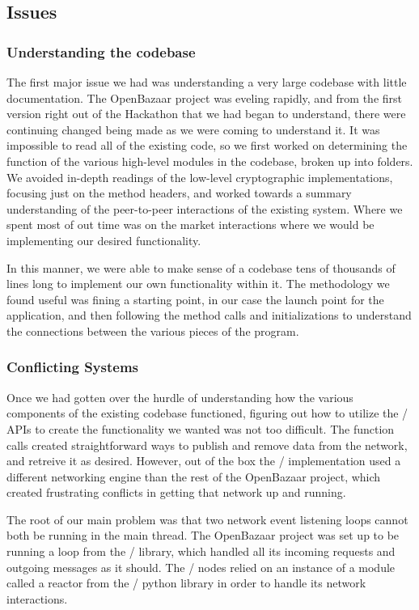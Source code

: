\documentclass[12pt,twocolumn]{article}
\begin{document}
\subsection{Issues}

\subsubsection{Understanding the codebase}
The first major issue we had was understanding a very large codebase with little documentation. The OpenBazaar project was eveling rapidly, and from the first version right out of the Hackathon that we had began to understand, there were continuing changed being made as we were coming to understand it. It was impossible to read all of the existing code, so we first worked on determining the function of the various high-level modules in the codebase, broken up into folders. We avoided in-depth readings of the low-level cryptographic implementations, focusing just on the method headers, and worked towards a summary understanding of the peer-to-peer interactions of the existing system. Where we spent most of out time was on the market interactions where we would be implementing our desired functionality.

In this manner, we were able to make sense of a codebase tens of thousands of lines long to implement our own functionality within it. The methodology we found useful was fining a starting point, in our case the launch point for the application, and then following the method calls and initializations to understand the connections between the various pieces of the program.

\subsubsection{Conflicting Systems}
Once we had gotten over the hurdle of understanding how the various components of the existing codebase functioned, figuring out how to utilize the \Entangled/ APIs to create the functionality we wanted was not too difficult. The function calls created straightforward ways to publish and remove data from the network, and retreive it as desired. However, out of the box the \Entangled/ implementation used a different networking engine than the rest of the OpenBazaar project, which created frustrating conflicts in getting that network up and running.

The root of our main problem was that two network event listening loops cannot both be running in the main thread. The OpenBazaar project was set up to be running a loop from the \Tornado/ library, which handled all its incoming requests and outgoing messages as it should. The \Entangled/ nodes relied on an instance of a module called a {{\sc reactor}} from the \Twisted/ python library in order to handle its network interactions.
\end{document}
